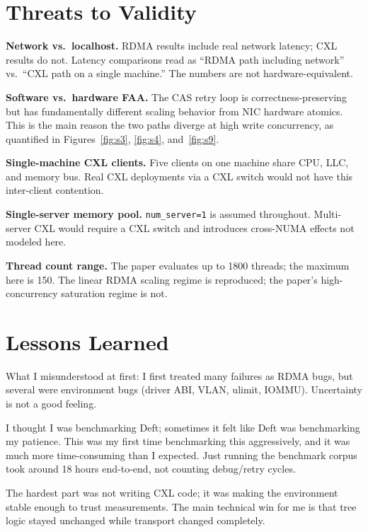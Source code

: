 \documentclass[10pt,twocolumn]{article}
\begin{document}
\section{Threats to Validity}

\textbf{Network vs.\ localhost.}
RDMA results include real network latency; CXL results do not.
Latency comparisons read as ``RDMA path including network'' vs.\ ``CXL path on
a single machine.'' The numbers are not hardware-equivalent.

\textbf{Software vs.\ hardware FAA.}
The CAS retry loop is correctness-preserving but has fundamentally different
scaling behavior from NIC hardware atomics.
This is the main reason the two paths diverge at high write concurrency, as
quantified in Figures~\ref{fig:s3}, \ref{fig:s4}, and~\ref{fig:s9}.

\textbf{Single-machine CXL clients.}
Five clients on one machine share CPU, LLC, and memory bus.
Real CXL deployments via a CXL switch would not have this inter-client
contention.

\textbf{Single-server memory pool.}
\texttt{num\_server=1} is assumed throughout.
Multi-server CXL would require a CXL switch and introduces cross-NUMA effects
not modeled here.

\textbf{Thread count range.}
The paper evaluates up to 1800 threads; the maximum here is 150.
The linear RDMA scaling regime is reproduced; the paper's high-concurrency
saturation regime is not.

\section{Lessons Learned}

What I misunderstood at first:
I first treated many failures as RDMA bugs, but several were environment bugs
(driver ABI, VLAN, ulimit, IOMMU).
Uncertainty is not a good feeling.

I thought I was benchmarking Deft; sometimes it felt like Deft was benchmarking
my patience.
This was my first time benchmarking this aggressively, and it was much more
time-consuming than I expected.
Just running the benchmark corpus took around 18 hours end-to-end, not counting
debug/retry cycles.

The hardest part was not writing CXL code; it was making the environment stable
enough to trust measurements.
The main technical win for me is that tree logic stayed unchanged while
transport changed completely.
\end{document}
